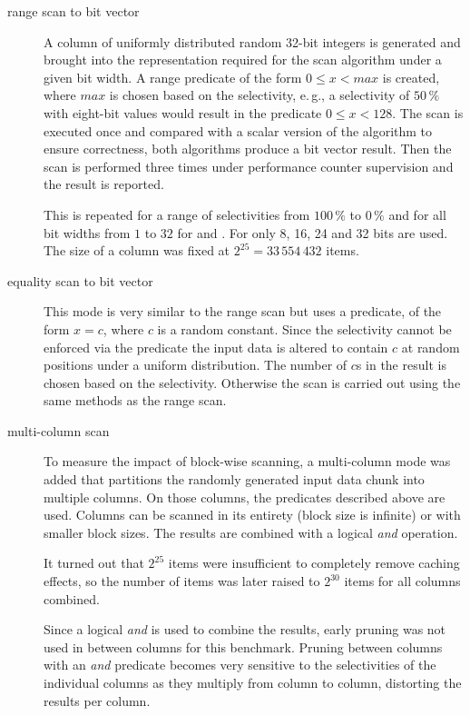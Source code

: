 \begin{description}
\item[range scan to bit vector]
  A column of uniformly distributed random 32-bit integers is generated and
  brought into the representation required for the scan algorithm under a
  given bit width. A range predicate of the form $0 \le x < max$ is created,
  where $max$ is chosen based on the selectivity, e.\,g., a selectivity of
  $50\,\%$ with eight-bit values would result in the predicate $0 \le x < 128$.
  The scan is executed once and compared with a scalar version of the algorithm
  to ensure correctness, both algorithms produce a bit vector result. Then the
  scan is performed three times under performance counter supervision and the
  result is reported.

  This is repeated for a range of selectivities from $100\,\%$ to $0\,\%$ and
  for all bit widths from $1$ to $32$ for \simdscan{} and \bwv{}. For \bs{} only
  8, 16, 24 and 32 bits are used. The size of a column was fixed at
  $2^{25}=33\,554\,432$ items.

\item[equality scan to bit vector]
  This mode is very similar to the range scan but uses a predicate, of the form
  $x = c$, where $c$ is a random constant. Since the selectivity cannot be
  enforced via the predicate the input data is altered to contain $c$ at random
  positions under a uniform distribution. The number of $c$s in the result is
  chosen based on the selectivity. Otherwise the scan is carried out using the
  same methods as the range scan.

\item[multi-column scan]
  To measure the impact of block-wise scanning, a multi-column mode was added
  that partitions the randomly generated input data chunk into multiple
  columns. On those columns, the predicates described above are used. Columns
  can be scanned in its entirety (block size is infinite) or with smaller
  block sizes. The results are combined with a logical \emph{and} operation.

  It turned out that $2^{25}$ items were insufficient to completely remove
  caching effects, so the number of items was later raised to $2^{30}$ items for
  all columns combined.

  Since a logical \emph{and} is used to combine the results, early pruning was
  not used in between columns for this benchmark. Pruning between columns with
  an \emph{and} predicate becomes very sensitive to the selectivities of the
  individual columns as they multiply from column to column, distorting the
  results per column.


\end{description}
